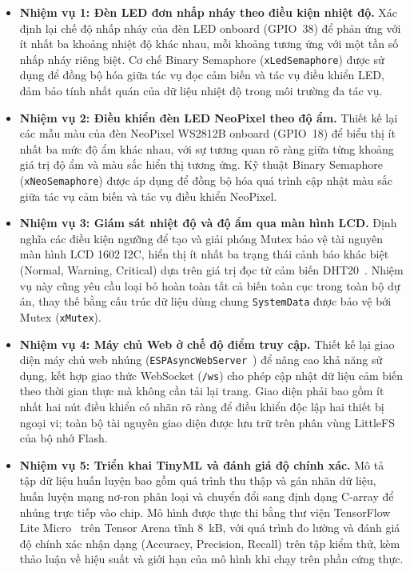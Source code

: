 \begin{itemize}
    \item \textbf{Nhiệm vụ 1: Đèn LED đơn nhấp nháy theo điều kiện nhiệt độ.}
    Xác định lại chế độ nhấp nháy của đèn LED onboard (GPIO~38) để phản ứng với ít nhất ba khoảng nhiệt độ khác nhau, mỗi khoảng tương ứng với một tần số nhấp nháy riêng biệt.
    Cơ chế Binary Semaphore (\texttt{xLedSemaphore}) được sử dụng để đồng bộ hóa giữa tác vụ đọc cảm biến và tác vụ điều khiển LED, đảm bảo tính nhất quán của dữ liệu nhiệt độ trong môi trường đa tác vụ.

    \item \textbf{Nhiệm vụ 2: Điều khiển đèn LED NeoPixel theo độ ẩm.}
    Thiết kế lại các mẫu màu của đèn NeoPixel WS2812B onboard (GPIO~18) để biểu thị ít nhất ba mức độ ẩm khác nhau, với sự tương quan rõ ràng giữa từng khoảng giá trị độ ẩm và màu sắc hiển thị tương ứng.
    Kỹ thuật Binary Semaphore (\texttt{xNeoSemaphore}) được áp dụng để đồng bộ hóa quá trình cập nhật màu sắc giữa tác vụ cảm biến và tác vụ điều khiển NeoPixel.

    \item \textbf{Nhiệm vụ 3: Giám sát nhiệt độ và độ ẩm qua màn hình LCD.}
    Định nghĩa các điều kiện ngưỡng để tạo và giải phóng Mutex bảo vệ tài nguyên màn hình LCD 1602 I2C, hiển thị ít nhất ba trạng thái cảnh báo khác biệt (Normal, Warning, Critical) dựa trên giá trị đọc từ cảm biến DHT20~\cite{dht20}.
    Nhiệm vụ này cũng yêu cầu loại bỏ hoàn toàn tất cả biến toàn cục trong toàn bộ dự án, thay thế bằng cấu trúc dữ liệu dùng chung \texttt{SystemData} được bảo vệ bởi Mutex (\texttt{xMutex}).

    \item \textbf{Nhiệm vụ 4: Máy chủ Web ở chế độ điểm truy cập.}
    Thiết kế lại giao diện máy chủ web nhúng (\texttt{ESPAsyncWebServer}~\cite{espassyncwebserver}) để nâng cao khả năng sử dụng, kết hợp giao thức WebSocket (\texttt{/ws}) cho phép cập nhật dữ liệu cảm biến theo thời gian thực mà không cần tải lại trang.
    Giao diện phải bao gồm ít nhất hai nút điều khiển có nhãn rõ ràng để điều khiển độc lập hai thiết bị ngoại vi; toàn bộ tài nguyên giao diện được lưu trữ trên phân vùng LittleFS~\cite{littlefs} của bộ nhớ Flash.

    \item \textbf{Nhiệm vụ 5: Triển khai TinyML và đánh giá độ chính xác.}
    Mô tả tập dữ liệu huấn luyện bao gồm quá trình thu thập và gán nhãn dữ liệu, huấn luyện mạng nơ-ron phân loại và chuyển đổi sang định dạng C-array để nhúng trực tiếp vào chip.
    Mô hình được thực thi bằng thư viện TensorFlow Lite Micro~\cite{tflitemicro} trên Tensor Arena tĩnh 8~kB, với quá trình đo lường và đánh giá độ chính xác nhận dạng (Accuracy, Precision, Recall) trên tập kiểm thử, kèm thảo luận về hiệu suất và giới hạn của mô hình khi chạy trên phần cứng thực.


\end{itemize}
